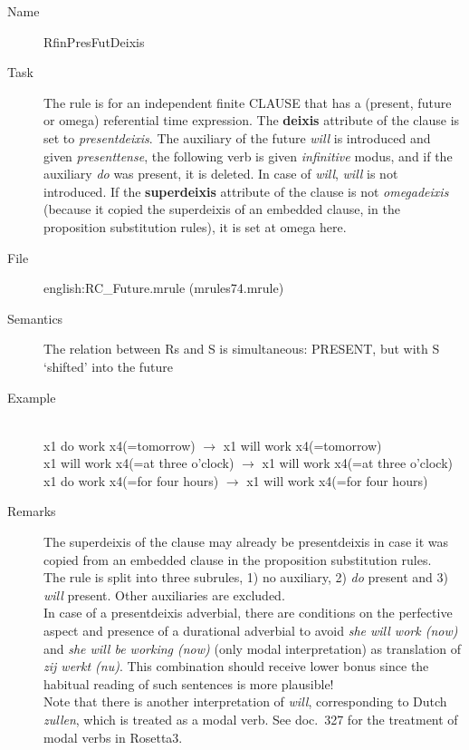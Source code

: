\begin{description}
\vspace{1 cm}
\begin{description}
\item[Name] RfinPresFutDeixis
\item[Task] The rule is for an independent finite CLAUSE that has a
(present, future or omega) referential time expression. 
The {\bf deixis} attribute of the clause is set to {\em presentdeixis\/}. 
The auxiliary of the future {\em will\/} is introduced and given {\em 
presenttense\/}, the following verb is given {\em infinitive\/} modus, 
and if the auxiliary {\em do\/} was present, it is deleted. In case of {\em 
will}, {\em will} is not introduced.
If the {
\bf superdeixis} attribute of the clause is not {\em omegadeixis\/} (because 
it copied the superdeixis of an embedded  clause, in the proposition 
substitution rules), it is set at omega here.
\item[File] english:RC\_Future.mrule (mrules74.mrule)
\item[Semantics] The relation between Rs and S is simultaneous: PRESENT, but 
with S `shifted' into the future
\item[Example] \mbox{}\\
x1 do work x4(=tomorrow) $\rightarrow$ x1 will work x4(=tomorrow)\\
x1 will work x4(=at three o'clock) $\rightarrow$ x1 will work x4(=at 
three o'clock)\\
x1 do work x4(=for four hours) $\rightarrow$ x1 will work x4(=for four hours)\\
\item[Remarks] 
The superdeixis of the clause may already be presentdeixis in 
case it was copied from an embedded  clause in the proposition substitution 
rules.\\
The rule is split into three subrules, 1) no auxiliary, 2) {\em do} present and 
3) {\em will} present. Other auxiliaries are excluded.\\
In case of a presentdeixis adverbial, there are conditions on the perfective 
aspect and presence of a durational adverbial to avoid {\em she will work (now)} 
and {\em she will be working (now)} (only modal interpretation) as translation 
of {\em zij werkt (nu)}. This combination should receive lower bonus since 
the habitual reading of such sentences is more plausible!\\
Note that there is another interpretation of {\em will}, corresponding to Dutch 
{\em zullen}, which is treated as a modal verb. See doc.\ 327 for the 
treatment of modal verbs in Rosetta3.
\end{description}


\end{description}
